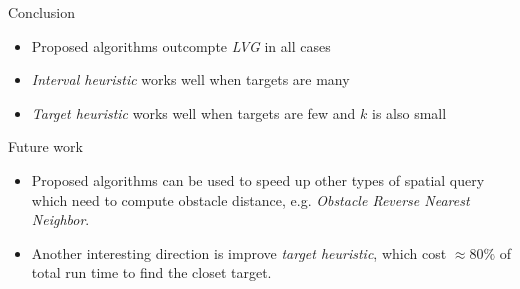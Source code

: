 \begin{frame}{Conclusion}
    \begin{itemize}
        \item Proposed algorithms outcompte \textit{LVG} in all cases
        \item \textit{Interval heuristic} works well when targets are many
        \item \textit{Target heuristic} works well when targets are few and $k$ is also small
    \end{itemize}
\end{frame}

\begin{frame}{Future work}
    \begin{itemize}
        \item \small{
            Proposed algorithms can be used to speed up other types of spatial query which need to compute obstacle distance, e.g. \textit{Obstacle Reverse Nearest Neighbor}.
        }
        \item \small {
          Another interesting direction is improve \textit{target heuristic}, which cost $\approx 80\%$ of total run time to find the closet target.
        }
    \end{itemize}
\end{frame}